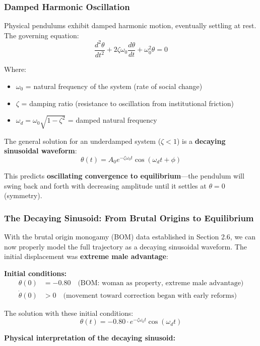 \documentclass[12pt, letterpaper]{article}
\begin{document}
\subsubsection{Damped Harmonic Oscillation}

Physical pendulums exhibit damped harmonic motion, eventually settling at rest. The governing equation:
\[
\frac{d^2\theta}{dt^2} + 2\zeta\omega_0\frac{d\theta}{dt} + \omega_0^2\theta = 0
\]

Where:
\begin{itemize}
    \item $\omega_0$ = natural frequency of the system (rate of social change)
    \item $\zeta$ = damping ratio (resistance to oscillation from institutional friction)
    \item $\omega_d = \omega_0\sqrt{1-\zeta^2}$ = damped natural frequency
\end{itemize}

The general solution for an underdamped system ($\zeta < 1$) is a \textbf{decaying sinusoidal waveform}:
\[
\theta(t) = A_0 e^{-\zeta\omega_0 t} \cos(\omega_d t + \phi)
\]

This predicts \textbf{oscillating convergence to equilibrium}---the pendulum will swing back and forth with decreasing amplitude until it settles at $\theta = 0$ (symmetry).

\subsubsection{The Decaying Sinusoid: From Brutal Origins to Equilibrium}

With the brutal origin monogamy (BOM) data established in Section 2.6, we can now properly model the full trajectory as a decaying sinusoidal waveform. The initial displacement was \textbf{extreme male advantage}:

\textbf{Initial conditions:}
\begin{align*}
\theta(0) &= -0.80 \quad \text{(BOM: woman as property, extreme male advantage)} \\
\dot{\theta}(0) &> 0 \quad \text{(movement toward correction began with early reforms)}
\end{align*}

The solution with these initial conditions:
\[
\theta(t) = -0.80 \cdot e^{-\zeta\omega_0 t} \cos(\omega_d t)
\]

\textbf{Physical interpretation of the decaying sinusoid:}
\end{document}
